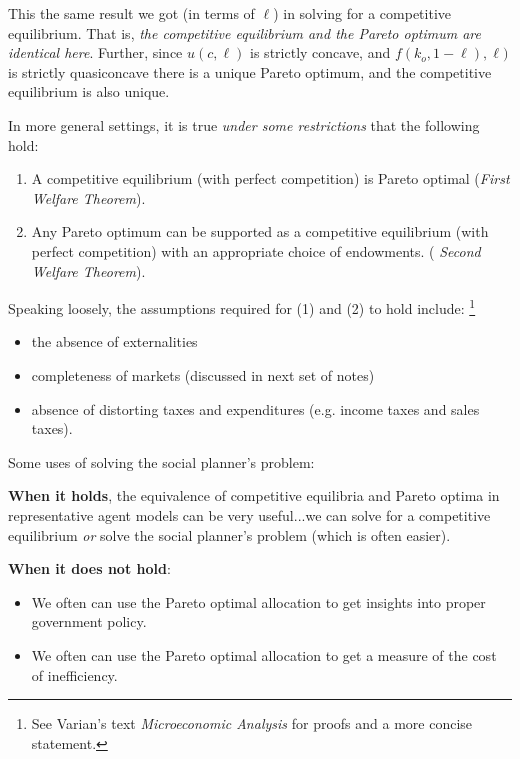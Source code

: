 \documentclass{sebase}
\begin{document}
This the same result we got (in terms of $\ell $) in solving for a
competitive equilibrium. That is, \textit{the competitive equilibrium and
the Pareto optimum are identical here}. Further, since $u(c,\ell )$ is
strictly concave, and $f\left( k_{o},1-\ell \right) ,\ell )$ is strictly
quasiconcave there is a unique Pareto optimum, and the competitive
equilibrium is also unique.

\noindent In more general settings, it is true \textit{under some
restrictions} that the following hold:

\begin{enumerate}
\item A competitive equilibrium (with perfect competition) is Pareto optimal
(\textit{First Welfare Theorem}).

\item Any Pareto optimum can be supported as a competitive equilibrium (with
perfect competition) with an appropriate choice of endowments. (\textit{%
Second Welfare Theorem}).
\end{enumerate}

Speaking loosely, the assumptions required for (1) and (2) to hold include:%
\footnote{%
See Varian's text \textit{Microeconomic Analysis }for proofs and a more
concise statement.}

\begin{itemize}
\item the absence of externalities

\item completeness of markets (discussed in next set of notes)

\item absence of distorting taxes and expenditures (e.g. income taxes and
sales taxes).
\end{itemize}

\pagebreak

Some uses of solving the social planner's problem:

\noindent \textbf{When it holds}, the equivalence of competitive equilibria
and Pareto optima in representative agent models can be very useful...we can
solve for a competitive equilibrium \textit{or} solve the social planner's
problem (which is often easier).

\noindent \textbf{When it does not hold}:

\begin{itemize}
\item We often can use the Pareto optimal allocation to get insights into
proper government policy.

\item We often can use the Pareto optimal allocation to get a measure of the
cost of inefficiency.
\end{itemize}
\end{document}
